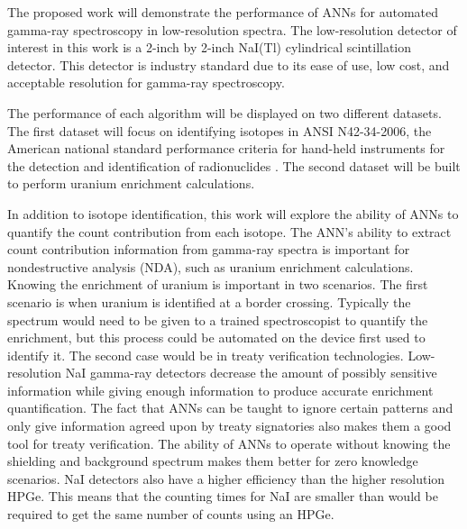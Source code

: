\documentclass[tocnosub,noragright,centerchapter,12pt,fullpage]{uiucecethesis09}
\begin{document}
The proposed work will demonstrate the performance of ANNs for automated gamma-ray spectroscopy in low-resolution spectra. The low-resolution detector of interest in this work is a 2-inch by 2-inch NaI(Tl) cylindrical scintillation detector. This detector is industry standard due to its ease of use, low cost, and acceptable resolution for gamma-ray spectroscopy. 

The performance of each algorithm will be displayed on two different datasets. The first dataset will focus on identifying isotopes in ANSI N42-34-2006, the American national standard performance criteria for hand-held instruments for the detection and identification of radionuclides \cite{ANSI}. The second dataset will be built to perform uranium enrichment calculations.



In addition to isotope identification, this work will explore the ability of ANNs to quantify the count contribution from each isotope. The ANN's ability to extract count contribution information from gamma-ray spectra is important for nondestructive analysis (NDA), such as uranium enrichment calculations. Knowing the enrichment of uranium is important in two scenarios. The first scenario is when uranium is identified at a border crossing. Typically the spectrum would need to be given to a trained spectroscopist to quantify the enrichment, but this process could be automated on the device first used to identify it. The second case would be in treaty verification technologies. Low-resolution NaI gamma-ray detectors decrease the amount of possibly sensitive information while giving enough information to produce accurate enrichment quantification. The fact that ANNs can be taught to ignore certain patterns and only give information agreed upon by treaty signatories also makes them a good tool for treaty verification. The ability of ANNs to operate without knowing the shielding and background spectrum makes them better for zero knowledge scenarios. NaI detectors also have a higher efficiency than the higher resolution HPGe. This means that the counting times for NaI are smaller than would be required to get the same number of counts using an HPGe.    
\end{document}
